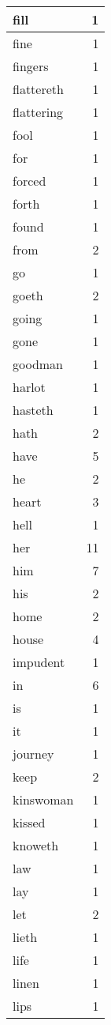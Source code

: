 \begin{center}
\begin{longtable}{l|r}
fill & 1\\ \hline 
fine & 1\\ \hline 
fingers & 1\\ \hline 
flattereth & 1\\ \hline 
flattering & 1\\ \hline 
fool & 1\\ \hline 
for & 1\\ \hline 
forced & 1\\ \hline 
forth & 1\\ \hline 
found & 1\\ \hline 
from & 2\\ \hline 
go & 1\\ \hline 
goeth & 2\\ \hline 
going & 1\\ \hline 
gone & 1\\ \hline 
goodman & 1\\ \hline 
harlot & 1\\ \hline 
hasteth & 1\\ \hline 
hath & 2\\ \hline 
have & 5\\ \hline 
he & 2\\ \hline 
heart & 3\\ \hline 
hell & 1\\ \hline 
her & 11\\ \hline 
him & 7\\ \hline 
his & 2\\ \hline 
home & 2\\ \hline 
house & 4\\ \hline 
impudent & 1\\ \hline 
in & 6\\ \hline 
is & 1\\ \hline 
it & 1\\ \hline 
journey & 1\\ \hline 
keep & 2\\ \hline 
kinswoman & 1\\ \hline 
kissed & 1\\ \hline 
knoweth & 1\\ \hline 
law & 1\\ \hline 
lay & 1\\ \hline 
let & 2\\ \hline 
lieth & 1\\ \hline 
life & 1\\ \hline 
linen & 1\\ \hline 
lips & 1\\ \hline 

\end{longtable}
\end{center}
